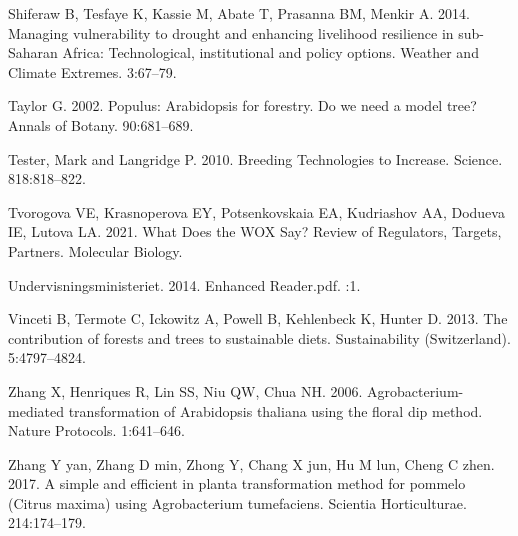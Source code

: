 \documentclass[
]{article}
\newlength{\cslhangindent}
\newenvironment{CSLReferences}[2] %
 {%
  \setlength{\parindent}{0pt}
  \ifodd #1 \everypar{\setlength{\hangindent}{\cslhangindent}}\ignorespaces\fi
  \ifnum #2 > 0
  \setlength{\parskip}{#2\baselineskip}
  \fi
 }%
 {}
\begin{document}
\begin{CSLReferences}{0}{0}
\leavevmode{}%
Shiferaw B, Tesfaye K, Kassie M, Abate T, Prasanna BM, Menkir A. 2014.
{Managing vulnerability to drought and enhancing livelihood resilience
in sub-Saharan Africa: Technological, institutional and policy options}.
Weather and Climate Extremes. 3:67--79.

\leavevmode{}%
Taylor G. 2002. {Populus: Arabidopsis for forestry. Do we need a model
tree?} Annals of Botany. 90:681--689.

\leavevmode{}%
Tester, Mark and Langridge P. 2010. {Breeding Technologies to Increase}.
Science. 818:818--822.

\leavevmode{}%
Tvorogova VE, Krasnoperova EY, Potsenkovskaia EA, Kudriashov AA, Dodueva
IE, Lutova LA. 2021. {What Does the WOX Say? Review of Regulators,
Targets, Partners}. Molecular Biology.

\leavevmode{}%
Undervisningsministeriet. 2014. {Enhanced Reader.pdf}. :1.

\leavevmode{}%
Vinceti B, Termote C, Ickowitz A, Powell B, Kehlenbeck K, Hunter D.
2013. {The contribution of forests and trees to sustainable diets}.
Sustainability (Switzerland). 5:4797--4824.

\leavevmode{}%
Zhang X, Henriques R, Lin SS, Niu QW, Chua NH. 2006.
{Agrobacterium-mediated transformation of Arabidopsis thaliana using the
floral dip method}. Nature Protocols. 1:641--646.

\leavevmode{}%
Zhang Y yan, Zhang D min, Zhong Y, Chang X jun, Hu M lun, Cheng C zhen.
2017. {A simple and efficient in planta transformation method for
pommelo (Citrus maxima) using Agrobacterium tumefaciens}. Scientia
Horticulturae. 214:174--179.

\end{CSLReferences}
\end{document}
